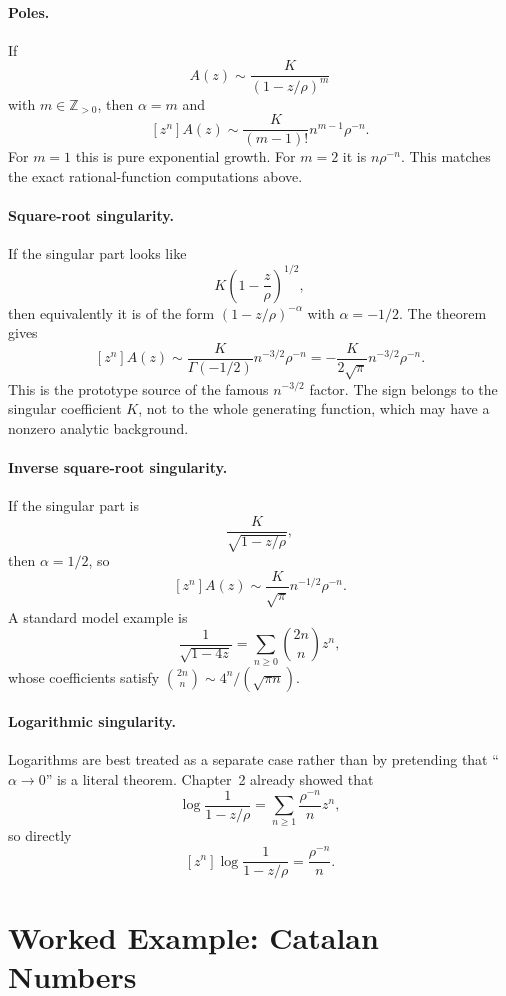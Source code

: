 \paragraph{Poles.}
If
\[
  A(z) \sim \frac{K}{(1-z/\rho)^m}
\]
with $m \in \mathbb{Z}_{>0}$, then $\alpha=m$ and
\[
  [z^n]A(z) \sim \frac{K}{(m-1)!} n^{m-1} \rho^{-n}.
\]
For $m=1$ this is pure exponential growth. For $m=2$ it is $n\rho^{-n}$. This matches the exact rational-function computations above.

\paragraph{Square-root singularity.}
If the singular part looks like
\[
  K\left(1-\frac{z}{\rho}\right)^{1/2},
\]
then equivalently it is of the form $(1-z/\rho)^{-\alpha}$ with $\alpha=-1/2$. The theorem gives
\[
  [z^n]A(z) \sim \frac{K}{\Gamma(-1/2)} n^{-3/2} \rho^{-n}
  = -\frac{K}{2\sqrt{\pi}} n^{-3/2} \rho^{-n}.
\]
This is the prototype source of the famous $n^{-3/2}$ factor. The sign belongs to the singular coefficient $K$, not to the whole generating function, which may have a nonzero analytic background.

\paragraph{Inverse square-root singularity.}
If the singular part is
\[
  \frac{K}{\sqrt{1-z/\rho}},
\]
then $\alpha = 1/2$, so
\[
  [z^n]A(z) \sim \frac{K}{\sqrt{\pi}} n^{-1/2} \rho^{-n}.
\]
A standard model example is
\[
  \frac{1}{\sqrt{1-4z}} = \sum_{n \ge 0} \binom{2n}{n} z^n,
\]
whose coefficients satisfy $\binom{2n}{n} \sim 4^n/(\sqrt{\pi n})$.

\paragraph{Logarithmic singularity.}
Logarithms are best treated as a separate case rather than by pretending that ``$\alpha \to 0$'' is a literal theorem. Chapter~2 already showed that
\[
  \log\frac{1}{1-z/\rho} = \sum_{n \ge 1} \frac{\rho^{-n}}{n} z^n,
\]
so directly
\[
  [z^n]\log\frac{1}{1-z/\rho} = \frac{\rho^{-n}}{n}.
\]

\section{Worked Example: Catalan Numbers}


